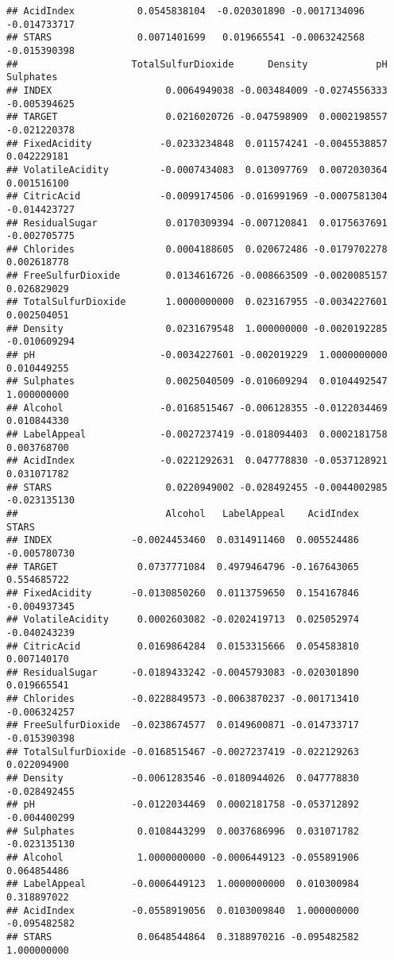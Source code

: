\documentclass[
]{article}
\begin{document}
\begin{verbatim}
## AcidIndex           0.0545838104  -0.020301890 -0.0017134096      -0.014733717
## STARS               0.0071401699   0.019665541 -0.0063242568      -0.015390398
##                    TotalSulfurDioxide      Density            pH    Sulphates
## INDEX                    0.0064949038 -0.003484009 -0.0274556333 -0.005394625
## TARGET                   0.0216020726 -0.047598909  0.0002198557 -0.021220378
## FixedAcidity            -0.0233234848  0.011574241 -0.0045538857  0.042229181
## VolatileAcidity         -0.0007434083  0.013097769  0.0072030364  0.001516100
## CitricAcid              -0.0099174506 -0.016991969 -0.0007581304 -0.014423727
## ResidualSugar            0.0170309394 -0.007120841  0.0175637691 -0.002705775
## Chlorides                0.0004188605  0.020672486 -0.0179702278  0.002618778
## FreeSulfurDioxide        0.0134616726 -0.008663509 -0.0020085157  0.026829029
## TotalSulfurDioxide       1.0000000000  0.023167955 -0.0034227601  0.002504051
## Density                  0.0231679548  1.000000000 -0.0020192285 -0.010609294
## pH                      -0.0034227601 -0.002019229  1.0000000000  0.010449255
## Sulphates                0.0025040509 -0.010609294  0.0104492547  1.000000000
## Alcohol                 -0.0168515467 -0.006128355 -0.0122034469  0.010844330
## LabelAppeal             -0.0027237419 -0.018094403  0.0002181758  0.003768700
## AcidIndex               -0.0221292631  0.047778830 -0.0537128921  0.031071782
## STARS                    0.0220949002 -0.028492455 -0.0044002985 -0.023135130
##                          Alcohol   LabelAppeal    AcidIndex        STARS
## INDEX              -0.0024453460  0.0314911460  0.005524486 -0.005780730
## TARGET              0.0737771084  0.4979464796 -0.167643065  0.554685722
## FixedAcidity       -0.0130850260  0.0113759650  0.154167846 -0.004937345
## VolatileAcidity     0.0002603082 -0.0202419713  0.025052974 -0.040243239
## CitricAcid          0.0169864284  0.0153315666  0.054583810  0.007140170
## ResidualSugar      -0.0189433242 -0.0045793083 -0.020301890  0.019665541
## Chlorides          -0.0228849573 -0.0063870237 -0.001713410 -0.006324257
## FreeSulfurDioxide  -0.0238674577  0.0149600871 -0.014733717 -0.015390398
## TotalSulfurDioxide -0.0168515467 -0.0027237419 -0.022129263  0.022094900
## Density            -0.0061283546 -0.0180944026  0.047778830 -0.028492455
## pH                 -0.0122034469  0.0002181758 -0.053712892 -0.004400299
## Sulphates           0.0108443299  0.0037686996  0.031071782 -0.023135130
## Alcohol             1.0000000000 -0.0006449123 -0.055891906  0.064854486
## LabelAppeal        -0.0006449123  1.0000000000  0.010300984  0.318897022
## AcidIndex          -0.0558919056  0.0103009840  1.000000000 -0.095482582
## STARS               0.0648544864  0.3188970216 -0.095482582  1.000000000
\end{verbatim}
\end{document}
